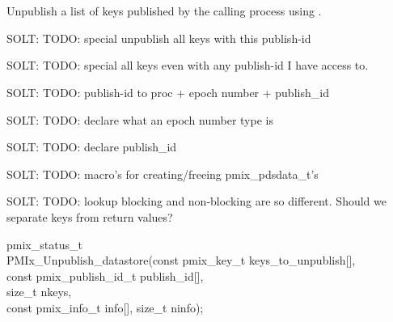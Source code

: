 \section{}

\summary

Unpublish a list of keys published by the calling process using .

SOLT: TODO: special unpublish all keys with this publish-id

SOLT: TODO: special all keys even with any publish-id I have access to.

SOLT: TODO: publish-id to proc + epoch number + publish_id

SOLT: TODO: declare what an epoch number type is

SOLT: TODO: declare publish_id

SOLT: TODO: macro's for creating/freeing pmix_pdsdata_t's

SOLT: TODO: lookup blocking and non-blocking are so different.  Should we separate keys from return values?


\format

\cspecificstart
\begin{codepar}
pmix_status_t \\
PMIx_Unpublish_datastore(const pmix_key_t keys_to_unpublish[], \\
\hspace*{15\sigspace}const pmix_publish_id_t publish_id[], \\
\hspace*{15\sigspace}size_t nkeys, \\
\hspace*{15\sigspace}const pmix_info_t info[], size_t ninfo);
\end{codepar}
\cspecificend

\begin{arglist}
\end{arglist}

